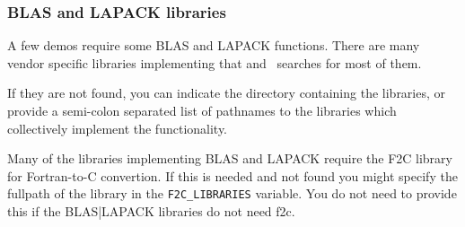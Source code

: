 \subsubsection{BLAS and LAPACK libraries}

A few demos require some BLAS and LAPACK functions. There are many vendor specific
libraries implementing that and \cmake\ searches for most of them.

If they are not found, you can indicate the directory containing the libraries, or provide a
semi-colon separated list of pathnames to the libraries which collectively implement the functionality.

Many of the libraries implementing BLAS and LAPACK require the F2C library for Fortran-to-C convertion.
If this is needed and not found you might specify the fullpath of the library in the \texttt{F2C\_LIBRARIES}
variable. You do not need to provide this if the BLAS|LAPACK libraries do not need f2c.
 
